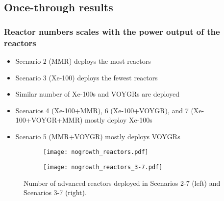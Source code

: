 \subsection{Once-through results}

\begin{frame}
    \frametitle{Reactor numbers scales with the power 
    output of the reactors}
            \begin{itemize}
                \item Scenario 2 (MMR) deploys the most reactors
                \item Scenario 3 (Xe-100) deploys the fewest reactors
                \item Similar number of Xe-100s and VOYGRs are deployed
                \item Scenarios 4 (Xe-100+MMR), 6 (Xe-100+VOYGR), and 7 
                      (Xe-100+VOYGR+MMR) mostly deploy Xe-100s 
                \item Scenario 5 (MMR+VOYGR) mostly deploys VOYGRs
            \end{itemize}
        \begin{figure}
        \begin{subfigure}{0.495\textwidth}
                \centering
                \texttt{[image: nogrowth\_reactors.pdf]}
        \end{subfigure}
        \hfill
        \begin{subfigure}{0.495\textwidth}
            \centering
            \texttt{[image: nogrowth\_reactors\_3-7.pdf]}
        \end{subfigure}
        \vspace{-0.15cm}
        \caption{Number of advanced reactors deployed in Scenarios 2-7 (left)
        and Scenarios 3-7 (right).}
        \end{figure}
\end{frame}

